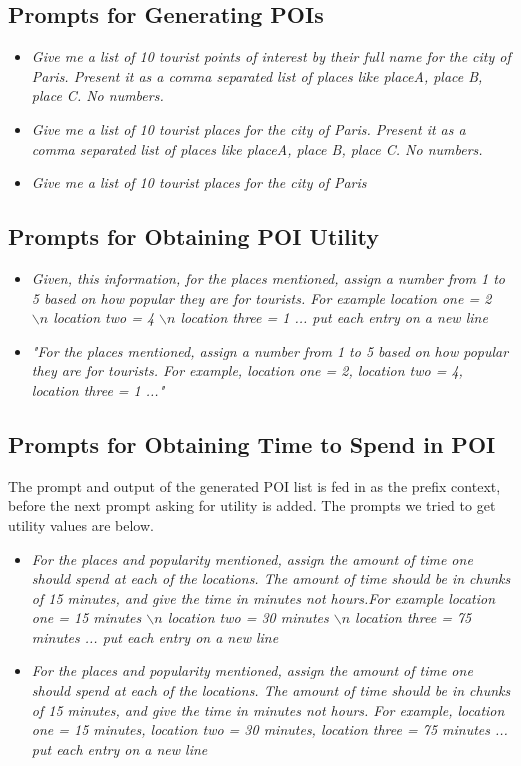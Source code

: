 \documentclass[doubleblind]{ecai}
\begin{document}
\subsection{Prompts for Generating POIs}
\begin{itemize}
    \item \textit{Give me a list of 10 tourist points of interest by their full name for the city of Paris. Present it as a comma separated list of places like placeA, place B, place C. No numbers.}    
    \item \textit{Give me a list of 10 tourist places for the city of Paris. Present it as a comma separated list of places like placeA, place B, place C. No numbers.}
    \item \textit{Give me a list of 10 tourist places for the city of Paris}
\end{itemize}
\subsection{Prompts for Obtaining POI Utility}
\begin{itemize}
    \item \textit{Given, this information, for the places mentioned, assign a number from 1 to 5 based on how popular they are for tourists. For example location one = 2 $\backslash{n}$ location two = 4 $\backslash{n}$ location three = 1 ... put each entry on a new line}
    \item \textit{"For the places mentioned, assign a number from 1 to 5 based on how popular they are for tourists. For example, location one = 2, location two = 4, location three = 1 ..."}
\end{itemize}
\subsection{Prompts for Obtaining Time to Spend in POI}

The prompt and output of the generated POI list is fed in as the prefix context, before the next prompt asking for utility is added. The prompts we tried to get utility values are below.
\begin{itemize}
    \item \textit{For the places and popularity mentioned, assign the amount of time one should spend at each of the locations.
        The amount of time should be in chunks of 15 minutes, and give the time in minutes not hours.For example
        location one = 15 minutes $\backslash{n}$ location two = 30 minutes $\backslash{n}$ location three = 75 minutes ... put each entry on a new line}
    \item \textit{For the places and popularity mentioned, assign the amount of time one should spend at each of the locations. The amount of time should be in chunks of 15 minutes, and give the time in minutes not hours. For example, location one = 15 minutes, location two = 30 minutes, location three = 75 minutes ... put each entry on a new line}
    
\end{itemize}
\end{document}
